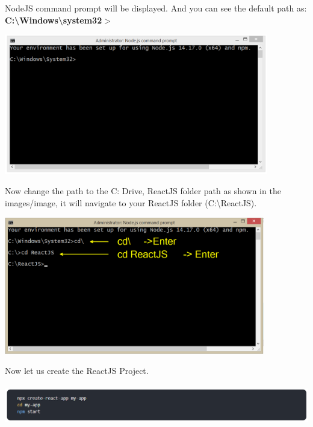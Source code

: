 \documentclass{article}
\begin{document}
\noindent 

\noindent 

 
   NodeJS command prompt will be displayed. And you can see the default path as: \textbf{C:{\textbackslash}Windows{\textbackslash}system32$\boldsymbol{\mathrm{>}}$}
 

\noindent \textbf{}

\begin{center}
	\noindent \includegraphics*[width=4.54in, height=2.41in]{IMG-06-29}
\end{center}

\noindent Now change the path to the C: Drive, ReactJS folder path as shown in the images/image, it will navigate to your ReactJS folder (C:{\textbackslash}ReactJS). 
 

\begin{center}
	\noindent \includegraphics*[width=4.48in, height=2.36in]{IMG-06-30}
\end{center}

\noindent 

 
\noindent Now let us create the ReactJS Project. 
 

\begin{center}
	\noindent \includegraphics*[width=5.70in, height=0.68in]{IMG-06-31}
\end{center}
\end{document}
